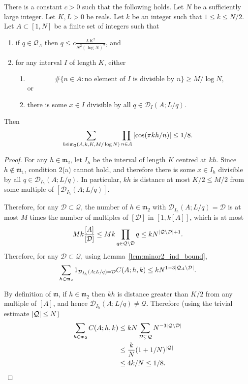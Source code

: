 \begin{lemma}\label{lem:minor2_bound}
There is a constant $c>0$ such that the following holds. Let $N$ be a sufficiently large integer. Let $K,L>0$ be reals. Let $k$ be an integer such that $1\leq k \leq N/2$.  Let $A\subset [1,N]$ be a finite set of integers such that
\begin{enumerate}
\item if $q\in\mathcal{Q}_A$ then $q\leq c\frac{LK^2}{N^2(\log N)^2}$,  and
\item for any interval $I$ of length $K$, either
\begin{enumerate}
\item \[\# \{ n\in A : \textrm{no element of }I\textrm{ is divisible by }n\}\geq M/\log N,\]
or
\item there is some $x\in I$ divisible by all $q\in\mathcal{D}_I(A;L/q)$.
\end{enumerate}
\end{enumerate}
Then
\[\sum_{h\in\mathfrak{m}_2(A,k,K,M/\log N)}\prod_{n\in A}\left\lvert \cos(\pi kh/n)\right\rvert\leq 1/8.\]
\end{lemma}
\begin{proof}
For any $h\in\mathfrak{m}_2$, let $I_h$ be the interval of length $K$ centred at $kh$. Since $h\not\in\mathfrak{m}_1$, condition 2(a) cannot hold, and therefore there is some $x\in I_h$ divisible by all $q\in\mathcal{D}_{I_h}(A;L/q)$. In particular, $kh$ is distance at most $K/2\leq M/2$ from some multiple of $[\mathcal{D}_{I_h}(A;L/q)]$.

Therefore, for any $\mathcal{D}\subset \mathcal{Q}$, the number of $h\in\mathfrak{m}_2$ with $\mathcal{D}_{I_h}(A;L/q)=\mathcal{D}$ is at most $M$ times the number of multiples of $[\mathcal{D}]$ in $[1,k[A]]$, which is at most
\[Mk\frac{[A]}{[\mathcal{D}]} \leq Mk\prod_{q\in\mathcal{Q}\backslash\mathcal{D}}q\leq kN^{\left\lvert \mathcal{Q}\backslash \mathcal{D}\right\rvert+1}.\]
Therefore, for any $\mathcal{D}\subset\mathcal{Q}$, using Lemma~\ref{lem:minor2_ind_bound},
\[\sum_{h\in \mathfrak{m}_2}1_{\mathcal{D}_{I_h}(A;L/q)=\mathcal{D}}C(A;h,k)\leq kN^{1-3\left\lvert \mathcal{Q}_A\backslash\mathcal{D}\right\rvert}.\]


By definition of $\mathfrak{m}$, if $h\in\mathfrak{m}_2$ then $kh$ is distance greater than $K/2$ from any multiple of $[A]$, and hence $\mathcal{D}_{I_h}(A;L/q)\neq \mathcal{Q}$. Therefore (using the trivial estimate $\left\lvert \mathcal{Q}\right\rvert\leq N$)
\begin{align*}
\sum_{h\in\mathfrak{m}_2}C(A;h,k)
&\leq
kN\sum_{\mathcal{D}\subsetneq \mathcal{Q}}N^{-3\left\lvert \mathcal{Q}\backslash \mathcal{D}\right\rvert}\\
&\leq \frac{k}{N}(1+1/N)^{\left\lvert \mathcal{Q}\right\rvert}\\
&\leq 4k/N \leq 1/8.
\end{align*}
\end{proof}

